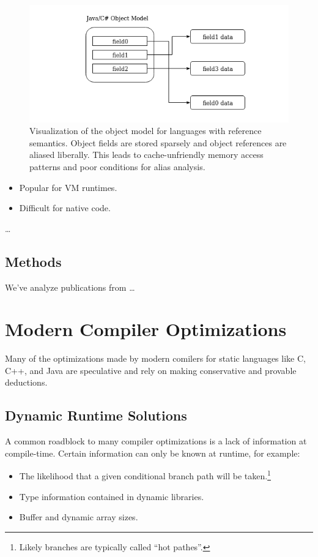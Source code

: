 \documentclass[nobib]{tufte-handout}
\newcommand{\placeholdertext}[1]{
	\noindent{\color{red}{#1}}
}
\begin{document}
\begin{figure} 
\includegraphics[width=\linewidth]{images/JavaObjectModel.png}
\caption{Visualization of the object model for languages with reference semantics.  Object fields are stored sparsely and object references are aliased liberally.  This leads to cache-unfriendly memory access patterns and poor conditions for alias analysis.}
\label{fig:JavaObjectModel}
\end{figure}




\begin{itemize}
\item Popular for VM runtimes.
\item Difficult for native code.
\end{itemize}


\placeholdertext{Cache latency is one of the largest factors in program speed} \ldots



\subsection{Methods}
We've analyze publications from \placeholdertext{LIST OF CONFERENCES} \ldots


\section{Modern Compiler Optimizations}
Many of the optimizations made by modern comilers for static languages like C, C++, and Java are speculative and rely on making conservative and provable deductions.  


\subsection{Dynamic Runtime Solutions}
A common roadblock to many compiler optimizations is a lack of information at compile-time.  Certain information can only be known at runtime, for example: 
\begin{itemize}
\item The likelihood that a given conditional branch path will be taken.\footnote{Likely branches are typically called ``hot pathes''.}
\item Type information contained in dynamic libraries.
\item Buffer and dynamic array sizes.
\end{itemize}
\end{document}
